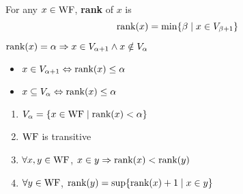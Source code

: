 \documentclass[11pt]{article}
\begin{document}
\begin{definition}[]
For any \(x\in\operatorname{WF}\), \textbf{rank} of \(x\) is
\begin{equation*}
\text{rank}(x)=\min\{\beta\mid x\in V_{\beta+1}\}
\end{equation*}
\end{definition}

\(\text{rank}(x)=\alpha\Rightarrow x\in V_{\alpha+1}\wedge x\notin V_\alpha\)

\begin{itemize}
\item \(x\in V_{\alpha+1}\Leftrightarrow\text{rank}(x)\le\alpha\)
\item \(x\subseteq V_\alpha\Leftrightarrow\text{rank}(x)\le\alpha\)
\end{itemize}

\begin{lemma}[]
\begin{enumerate}
\item \(V_\alpha=\{x\in\operatorname{WF}\mid\text{rank}(x)<\alpha\}\)
\item \(\operatorname{WF}\) is transitive
\item \(\forall x,y\in\operatorname{WF}\), \(x\in y\Rightarrow\text{rank}(x)<\text{rank}(y)\)
\item \(\forall y\in\operatorname{WF}\), \(\text{rank}(y)=\sup\{\text{rank}(x)+1\mid x\in y\}\)
\end{enumerate}
\end{lemma}
\end{document}
